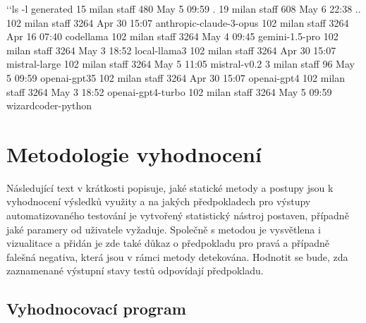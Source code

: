 \documentclass[czech, ma, kiv, he, iso690numb, pdf, viewonly]{fasthesis}
\begin{document}
    \begin{console}
`\uxprompt`ls -l generated
 15 milan  staff   480 May  5 09:59 .
 19 milan  staff   608 May  6 22:38 ..
102 milan  staff  3264 Apr 30 15:07 anthropic-claude-3-opus
102 milan  staff  3264 Apr 16 07:40 codellama
102 milan  staff  3264 May  4 09:45 gemini-1.5-pro
102 milan  staff  3264 May  3 18:52 local-llama3
102 milan  staff  3264 Apr 30 15:07 mistral-large
102 milan  staff  3264 May  5 11:05 mistral-v0.2
  3 milan  staff    96 May  5 09:59 openai-gpt35
102 milan  staff  3264 Apr 30 15:07 openai-gpt4
102 milan  staff  3264 May  3 18:52 openai-gpt4-turbo
102 milan  staff  3264 May  5 09:59 wizardcoder-python\end{console}
    
    \section{Metodologie vyhodnocení}

        Následující text v krátkosti popisuje, jaké statické metody a postupy jsou k vyhodnocení výsledků využity a na jakých předpokladech pro výstupy automatizovaného testování je vytvořený statistický nástroj postaven, případně jaké paramery od uživatele vyžaduje. Společně s metodou je vysvětlena i vizualitace a přidán je zde také důkaz o předpokladu pro pravá a případně falešná negativa, která jsou v rámci metody detekována. Hodnotit se bude, zda zaznamenané výstupní stavy testů odpovídají předpokladu.
        
        \subsection{Vyhodnocovací program} \label{sec:evaluation}
\end{document}
